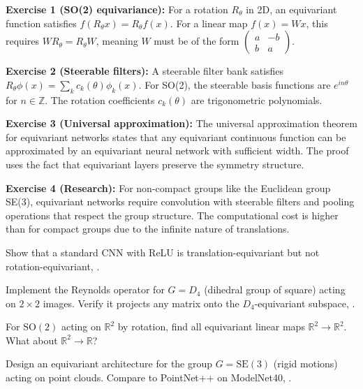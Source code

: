 \begin{solution}
\textbf{Exercise 1 (SO(2) equivariance):} For a rotation $R_\theta$ in 2D, an equivariant function satisfies $f(R_\theta x) = R_\theta f(x)$. For a linear map $f(x) = Wx$, this requires $WR_\theta = R_\theta W$, meaning $W$ must be of the form $\begin{pmatrix} a & -b \\ b & a \end{pmatrix}$.
\end{solution}

\begin{solution}
\textbf{Exercise 2 (Steerable filters):} A steerable filter bank satisfies $R_\theta \phi(x) = \sum_k c_k(\theta) \phi_k(x)$. For SO(2), the steerable basis functions are $e^{in\theta}$ for $n \in \mathbb{Z}$. The rotation coefficients $c_k(\theta)$ are trigonometric polynomials.
\end{solution}

\begin{solution}
\textbf{Exercise 3 (Universal approximation):} The universal approximation theorem for equivariant networks states that any equivariant continuous function can be approximated by an equivariant neural network with sufficient width. The proof uses the fact that equivariant layers preserve the symmetry structure.
\end{solution}

\begin{solution}
\textbf{Exercise 4 (Research):} For non-compact groups like the Euclidean group SE(3), equivariant networks require convolution with steerable filters and pooling operations that respect the group structure. The computational cost is higher than for compact groups due to the infinite nature of translations.
\end{solution}

\label{sec:eq:exercises}

\begin{exercise}
Show that a standard CNN with ReLU is translation-equivariant but not rotation-equivariant, \cite{lim2023equivariant}.
\end{exercise}

\begin{exercise}
Implement the Reynolds operator for $G = D_4$ (dihedral group of square) acting on $2 \times 2$ images. Verify it projects any matrix onto the $D_4$-equivariant subspace, \cite{lim2023equivariant}.
\end{exercise}

\begin{exercise}
For $\mathrm{SO}(2)$ acting on $\mathbb{R}^2$ by rotation, find all equivariant linear maps $\mathbb{R}^2 \to \mathbb{R}^2$. What about $\mathbb{R}^2 \to \mathbb{R}$? \cite{lim2023equivariant}
\end{exercise}

\begin{exercise}[Research]
Design an equivariant architecture for the group $G = \mathrm{SE}(3)$ (rigid motions) acting on point clouds. Compare to PointNet++ on ModelNet40, \cite{lim2023equivariant}.
\end{exercise}
